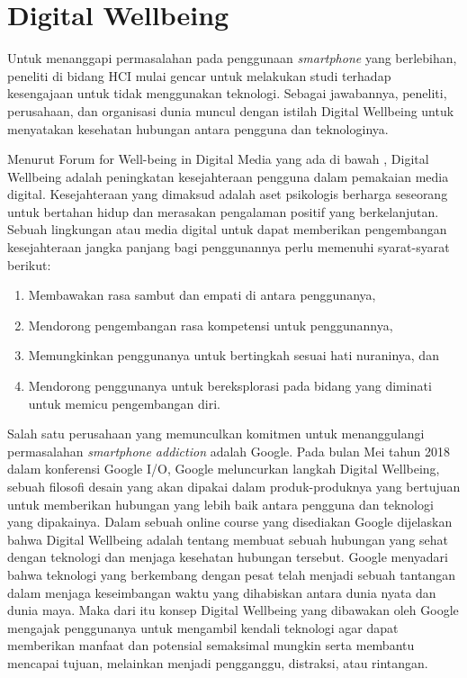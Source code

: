 \section{Digital Wellbeing}
\label{sec:digital_wellbeing}

Untuk menanggapi permasalahan pada penggunaan \textit{smartphone} yang berlebihan, peneliti di bidang HCI mulai gencar untuk melakukan studi terhadap kesengajaan untuk tidak menggunakan teknologi. Sebagai jawabannya, peneliti, perusahaan, dan organisasi dunia muncul dengan istilah Digital Wellbeing untuk menyatakan kesehatan hubungan antara pengguna dan teknologinya. 

Menurut Forum for Well-being in Digital Media yang ada di bawah \textcite{unesco2015dwconference}, Digital Wellbeing adalah peningkatan kesejahteraan pengguna dalam pemakaian media digital. Kesejahteraan yang dimaksud adalah aset psikologis berharga seseorang untuk bertahan hidup dan merasakan pengalaman positif yang berkelanjutan. Sebuah lingkungan atau media digital untuk dapat memberikan pengembangan kesejahteraan jangka panjang bagi penggunannya perlu memenuhi syarat-syarat berikut:

\begin{enumerate}
  \item Membawakan rasa sambut dan empati di antara penggunanya,
  \item Mendorong pengembangan rasa kompetensi untuk penggunannya,
  \item Memungkinkan penggunanya untuk bertingkah sesuai hati nuraninya, dan
  \item Mendorong penggunanya untuk bereksplorasi pada bidang yang diminati untuk memicu pengembangan diri.
\end{enumerate}

Salah satu perusahaan yang memunculkan komitmen untuk menanggulangi permasalahan \textit{smartphone addiction} adalah Google. Pada bulan Mei tahun 2018 dalam konferensi Google I/O, Google meluncurkan langkah Digital Wellbeing, sebuah filosofi desain yang akan dipakai dalam produk-produknya yang bertujuan untuk memberikan hubungan yang lebih baik antara pengguna dan teknologi yang dipakainya. Dalam sebuah online course yang disediakan Google dijelaskan bahwa Digital Wellbeing adalah tentang membuat sebuah hubungan yang sehat dengan teknologi dan menjaga kesehatan hubungan tersebut. Google menyadari bahwa teknologi yang berkembang dengan pesat telah menjadi sebuah tantangan dalam menjaga keseimbangan waktu yang dihabiskan antara dunia nyata dan dunia maya. Maka dari itu konsep Digital Wellbeing yang dibawakan oleh Google mengajak penggunanya untuk mengambil kendali teknologi agar dapat memberikan manfaat dan potensial semaksimal mungkin serta membantu mencapai tujuan, melainkan menjadi pengganggu, distraksi, atau rintangan. \parencite{google2019dwcourse}

